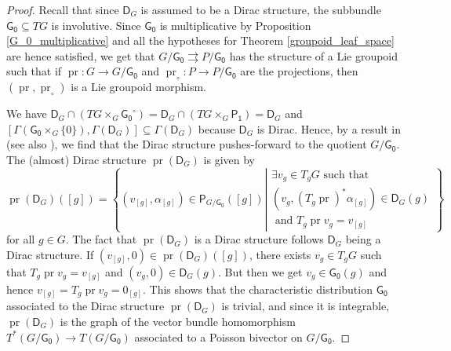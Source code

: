 \documentclass{amsart}
\theoremstyle{definition}
\begin{document}
\begin{proof}
Recall that  since  $\mathsf D_G$ is assumed to be a Dirac structure, the subbundle
 $\mathsf{G_0}\subseteq TG$ is involutive.
Since $\mathsf{G_0}$ is multiplicative 
by Proposition \ref{G_0_multiplicative}
and all the hypotheses for Theorem \ref{groupoid_leaf_space}
are hence satisfied, we get that $G/\mathsf{G_0}{{\rightrightarrows}} P/\mathsf{G_0}$
has the structure of a Lie groupoid such that if 
$\operatorname{pr}:G\to G/\mathsf{G_0}$ and $\operatorname{pr}_\circ:P\to P/\mathsf{G_0}$
are the projections, then
$(\operatorname{pr},\operatorname{pr}_\circ)$ is a Lie groupoid morphism.

We have $\mathsf D_G\cap(TG\times_G\mathsf{G_0}^\circ)
=\mathsf D_G\cap(TG\times_G\mathsf{P_1})=\mathsf D_G$ and 
$[\Gamma(\mathsf{G_0}\times_G\{0\}), \Gamma(\mathsf D_G)]\subseteq \Gamma(\mathsf
D_G)$ because $\mathsf D_G$ is Dirac.
Hence, by a result in \cite{Zambon08} (see also \cite{JoRaZa11}), we find that 
the Dirac structure pushes-forward to the quotient $G/\mathsf{G_0}$.
The (almost) Dirac structure $\operatorname{pr}(\mathsf D_G)$  is given by
\[\operatorname{pr}(\mathsf D_G)([g])=
\left\{(v_{[g]},\alpha_{[g]})\in\mathsf P_{G/\mathsf{G_0}}([g])\left|
\begin{array}{c}
\exists v_g\in T_gG \text{ such that }\\
(v_g, (T_g\operatorname{pr})^*\alpha_{[g]})\in\mathsf D_G(g)\\
\text{ and } T_g\operatorname{pr} v_g=v_{[g]}
\end{array}\right.\right\}\]
for all $g\in G$.
The fact that $\operatorname{pr}(\mathsf D_G)$ is a Dirac structure follows $\mathsf D_G$ being a Dirac structure.
If $(v_{[g]},0)\in \operatorname{pr}(\mathsf D_G)([g])$, there exists 
$v_g\in T_gG$ such that $T_g\operatorname{pr} v_g=v_{[g]}$
and $(v_g,0)\in\mathsf D_G(g)$. But then we get $v_g\in\mathsf{G_0}(g)$
and hence $v_{[g]}=T_g\operatorname{pr} v_g=0_{[g]}$. This shows that
the characteristic distribution $\mathsf{G_0}$
associated to the Dirac structure $\operatorname{pr}(\mathsf D_G)$ is trivial, and 
since it is integrable, $\operatorname{pr}(\mathsf D_G)$ is the graph
of the vector bundle homomorphism $T^*(G/\mathsf{G_0})\to T(G/\mathsf{G_0})$
associated to a Poisson bivector on $G/\mathsf{G_0}$.


\end{proof}
\end{document}

